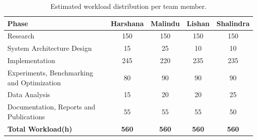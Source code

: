 \begin{table}[htbp]
\centering
\begin{tabularx}{\linewidth}{Xcccc}
\toprule
\textbf{Phase} & \textbf{Harshana} & \textbf{Malindu} & \textbf{Lishan} & \textbf{Shalindra} \\
\midrule
Research & 150 & 150 & 150 & 150 \\
System Architecture Design & 15 & 25 & 10 & 10 \\
Implementation & 245 & 220 & 235 & 235 \\
Experiments, Benchmarking and Optimization & 80 & 90 & 90 & 90 \\
Data Analysis & 15 & 20 & 20 & 25 \\
Documentation, Reports and Publications & 55 & 55 & 55 & 50 \\
\midrule
\textbf{Total Workload(h)} & \textbf{560} & \textbf{560} & \textbf{560} & \textbf{560}\\
\bottomrule
\end{tabularx}
\caption{Estimated workload distribution per team member.}
\label{tab:workload}
\end{table}